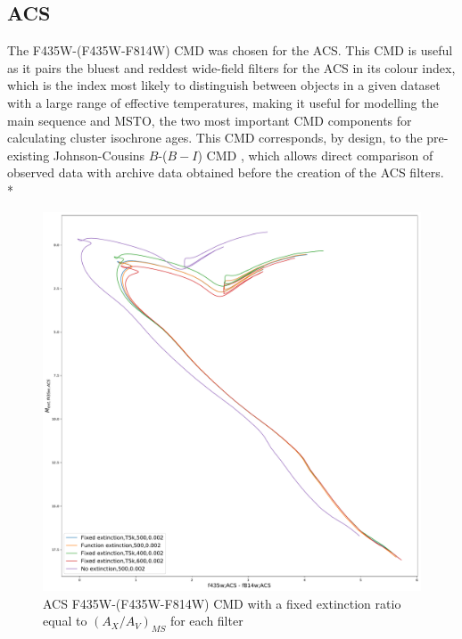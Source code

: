 \documentclass[12pt, a4paper]{report}
\begin{document}
\subsection{ACS} \label{ACS_isoc}
The F435W-(F435W-F814W) CMD was chosen for the ACS. This CMD is useful as it pairs the bluest and reddest wide-field filters for the ACS in its colour index, which is the index most likely to distinguish between objects in a given dataset with a large range of effective temperatures, making it useful for modelling the main sequence and MSTO, the two most important CMD components for calculating cluster isochrone ages. This CMD corresponds, by design, to the pre-existing Johnson-Cousins $B$-($B-I$) CMD \citep{2005PASP..117.1049S}, which allows direct comparison of observed data with archive data obtained before the creation of the ACS filters.\\*

\begin{figure}[h!]
\begin{center}
\includegraphics[width=1.0\textwidth]{../basti_isochrones_10_13Gyr/Extinction_T5k_FeH0fix_func_f435wACS_f435wACSmf814wACS_500_400_600_Myr_FeH_0p002_ref_noext_Av_1p0.pdf}
\caption{ACS F435W-(F435W-F814W) CMD with a fixed extinction ratio equal to $(A_{X}/A_{V})_{MS}$ for each filter}
\label{acs_isoc_T5k}
\end{center}
\end{figure}
\end{document}
